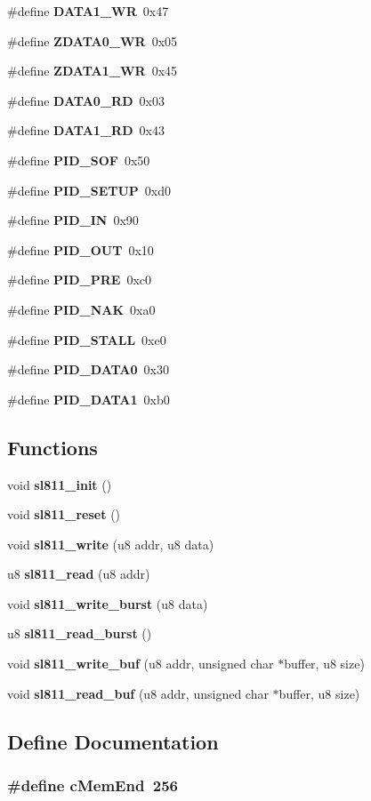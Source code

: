 \begin{CompactItemize}
\#define {\bf DATA1\_\-WR}~0x47
\item 
\#define {\bf ZDATA0\_\-WR}~0x05
\item 
\#define {\bf ZDATA1\_\-WR}~0x45
\item 
\#define {\bf DATA0\_\-RD}~0x03
\item 
\#define {\bf DATA1\_\-RD}~0x43
\item 
\#define {\bf PID\_\-SOF}~0x50
\item 
\#define {\bf PID\_\-SETUP}~0xd0
\item 
\#define {\bf PID\_\-IN}~0x90
\item 
\#define {\bf PID\_\-OUT}~0x10
\item 
\#define {\bf PID\_\-PRE}~0xc0
\item 
\#define {\bf PID\_\-NAK}~0xa0
\item 
\#define {\bf PID\_\-STALL}~0xe0
\item 
\#define {\bf PID\_\-DATA0}~0x30
\item 
\#define {\bf PID\_\-DATA1}~0xb0
\end{CompactItemize}
\subsection*{Functions}
\begin{CompactItemize}
\item 
void {\bf sl811\_\-init} ()
\item 
void {\bf sl811\_\-reset} ()
\item 
void {\bf sl811\_\-write} (u8 addr, u8 data)
\item 
u8 {\bf sl811\_\-read} (u8 addr)
\item 
void {\bf sl811\_\-write\_\-burst} (u8 data)
\item 
u8 {\bf sl811\_\-read\_\-burst} ()
\item 
void {\bf sl811\_\-write\_\-buf} (u8 addr, unsigned char $\ast$buffer, u8 size)
\item 
void {\bf sl811\_\-read\_\-buf} (u8 addr, unsigned char $\ast$buffer, u8 size)
\end{CompactItemize}


\subsection{Define Documentation}
\subsubsection{\setlength{\rightskip}{0pt plus 5cm}\#define c\-Mem\-End~256}\label{sl811hs_8h_79a7a43afc66ba0d46275dde691882d5}


